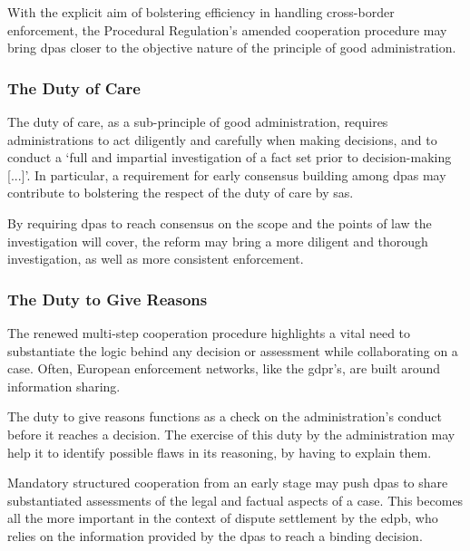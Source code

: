 With the explicit aim of bolstering efficiency in handling cross-border enforcement,\autocite[recital 17]{ProceduralRegulation} the Procedural Regulation's amended cooperation procedure may bring \glspl{dpa} closer to the objective nature of the principle of good administration. 

\subsubsection{The Duty of Care}
\label{sec:ch1-duty-of-care}
The duty of care, as a sub-principle of good administration, requires administrations to act diligently and carefully when making decisions\autocite[92--94]{hofmannDutyCareEU2020}, and to conduct a `full and impartial investigation of a fact set prior to decision-making [...]'.\autocite[84]{hofmannEvansRelationCharterFundamental2013}
In particular, a requirement for early consensus building among \glspl{dpa}\autocite[11]{ProceduralRegulation} may contribute to bolstering the respect of the duty of care by \glspl{sa}. 

By requiring \glspl{dpa} to reach consensus on the scope and the points of law the investigation will cover, the reform may bring a more diligent and thorough investigation, as well as more consistent enforcement.

\subsubsection{The Duty to Give Reasons}
\label{sec:ch1-duty-to-give-reasons}

The renewed multi-step cooperation procedure highlights a vital need to substantiate the logic behind any decision or assessment while collaborating on a case. 
Often, European enforcement networks, like the \gls{gdpr}'s, are built around information sharing.\autocites[140]{hofmannCompositeDecisionMaking2009}[61]{GDPR} 

The duty to give reasons functions as a check on the administration's conduct before it reaches a decision.\autocite[369--370]{craigProcess2018}
The exercise of this duty by the administration may help it to identify possible flaws in its reasoning, by having to explain them.\autocite[369--370]{craigProcess2018}

Mandatory structured cooperation from an early stage may push \glspl{dpa} to share substantiated assessments of the legal and factual aspects of a case. 
This becomes all the more important in the context of dispute settlement by the \gls{edpb}, who relies on the information provided by the \glspl{dpa} to reach a binding decision.

